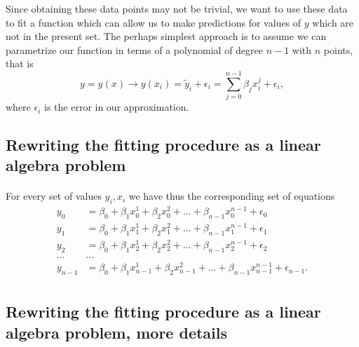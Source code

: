 \documentclass[%
oneside,                 %
final,                   %
10pt]{article}
\begin{document}
Since obtaining these data points may not be trivial, we want to use these data to fit a function which can allow us to make predictions for values of $y$ which are not in the present set. The perhaps simplest approach is to assume we can parametrize our function in terms of a polynomial of degree $n-1$ with $n$ points, that is
\[
y=y(x) \rightarrow y(x_i)=\tilde{y}_i+\epsilon_i=\sum_{j=0}^{n-1} \beta_j x_i^j+\epsilon_i,
\]
where $\epsilon_i$ is the error in our approximation.




\subsection{Rewriting the fitting procedure as a linear algebra problem}

\paragraph{}
For every set of values $y_i,x_i$ we have thus the corresponding set of equations
\begin{align*}
y_0&=\beta_0+\beta_1x_0^1+\beta_2x_0^2+\dots+\beta_{n-1}x_0^{n-1}+\epsilon_0\\
y_1&=\beta_0+\beta_1x_1^1+\beta_2x_1^2+\dots+\beta_{n-1}x_1^{n-1}+\epsilon_1\\
y_2&=\beta_0+\beta_1x_2^1+\beta_2x_2^2+\dots+\beta_{n-1}x_2^{n-1}+\epsilon_2\\
\dots & \dots \\
y_{n-1}&=\beta_0+\beta_1x_{n-1}^1+\beta_2x_{n-1}^2+\dots+\beta_{n-1}x_{n-1}^{n-1}+\epsilon_{n-1}.\\
\end{align*}




\subsection{Rewriting the fitting procedure as a linear algebra problem, more details}

\end{document}
